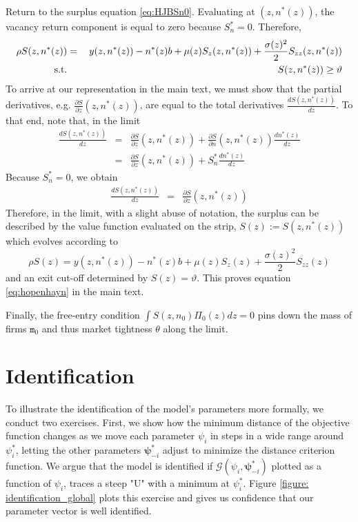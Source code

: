 Return to the surplus equation \eqref{eq:HJBSn0}. Evaluating at $(z,n^*(z))$, the vacancy return component is equal to zero because $S_n^* = 0$. Therefore,
\begin{eqnarray*}
\rho S(z,n^\ast(z)) &=& \: y(z,n^\ast(z)) - n^\ast(z) b + \mu(z) S_z(z,n^\ast(z)) + \frac{\sigma(z)^2}{2} S_{zz}(z,n^\ast(z)) \notag  \\
\text{s.t.} && S(z,n^\ast(z)) \geq \vartheta \notag
\end{eqnarray*}
To arrive at our representation in the main text, we must show that the partial derivatives, e.g. $\frac{\partial S}{\partial z}(z,n^*(z))$, are equal to the total derivatives $\frac{d S(z,n^*(z))}{dz}$. To that end, note that, in the limit
\begin{eqnarray*}
\frac{d S(z,n^*(z))}{d z} &=&
\frac{\partial S}{\partial z} (z,n^*(z)) + \frac{\partial S}{\partial n}(z,n^*(z)) \frac{dn^*(z)}{dz} \\
&=& \frac{\partial S}{\partial z} (z,n^*(z)) +S_n^* \frac{dn^*(z)}{dz}
\end{eqnarray*}
Because $S_n^* = 0$, we obtain
\begin{eqnarray*}
\frac{d S(z,n^*(z))}{d z} &=&
\frac{\partial S}{\partial z} (z,n^*(z))
\end{eqnarray*}
Therefore, in the limit, with a slight abuse of notation, the surplus can be described by the value function evaluated on the strip, ${S}(z):=S(z,n^\ast(z))$ which evolves according to
\begin{equation*}
\rho {S}(z) = y(z,n^*(z)) - n^*(z) b + \mu(z) {S}_z(z) + \frac{\sigma(z)^2}{2} {S}_{zz}(z)
\end{equation*}
and an exit cut-off determined by $S(z)=\vartheta$. This proves equation \eqref{eq:hopenhayn} in the main text.

Finally, the free-entry condition $\int S(z,n_0)\Pi_0(z)dz=0$ pins down the mass of firms $\texttt{m}_0$ and thus market tightness $\theta$ along the limit.

\section{Identification}\label{appx:identification}
To illustrate the identification of the model's parameters more formally, we conduct two exercises.
First, we show how the minimum distance of the objective function changes as we move each parameter $\psi_i$ in steps in a wide range around $\psi_i^\ast$, letting the other parameters $\pmb{\psi}_{-i}^*$ adjust to minimize the distance criterion function. We argue that the model is identified if 
$\mathcal{G}(\psi_i,\pmb{\psi}_{-i}^*)$ plotted as a function of ${\psi}_i$, traces a
steep "U" with a minimum at $\psi_i^\ast$. Figure \ref{figure: identification_global} plots this exercise and gives us confidence that our parameter vector is well identified.

